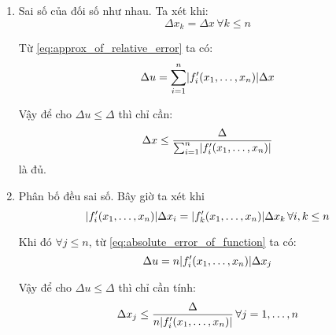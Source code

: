 \documentclass{book}    %
\DeclarePairedDelimiter\abs{\lvert}{\rvert}%
\begin{document}
\begin{enumerate}
    \item Sai số của  đối số như nhau.
        Ta xét khi:
        \begin{equation*}
            \Delta x_k = \Delta x \, \forall k \leq n
        \end{equation*}

        Từ \ref{eq:approx_of_relative_error} ta có:
        \begin{equation*}
            \Delta u = \sum_{i=1}^{n} \abs{f'_i(x_1, \ldots, x_n)} \Delta x
        \end{equation*}

        Vậy để cho \(\Delta u \leq \Delta\) thì chỉ cần:
        \begin{equation} \label{eq:same_error}
            \Delta x \leq \frac{\Delta}{\sum_{i=1}^{n} \abs{f'_i(x_1, \ldots, x_n)}}
        \end{equation}
        là đủ.

    \item Phân bố đều sai số.
        Bây giờ ta xét khi
        \begin{equation*}
            \abs{f'_i(x_1, \ldots, x_n)} \Delta x_i = \abs{f'_k(x_1, \ldots, x_n)} \Delta x_k \, \forall i, k \leq n
        \end{equation*}

        Khi đó \(\forall j \leq n\), từ \ref{eq:absolute_error_of_function} ta có:
        \begin{equation*}
            \Delta u = n \abs{f'_i(x_1, \ldots, x_n)} \Delta x_j
        \end{equation*}

        Vậy để cho \(\Delta u \leq \Delta\) thì chỉ cần tính:
        \begin{equation} \label{eq:evenly_distributed_error}
            \Delta x_j \leq \frac{\Delta}{n \abs{f'_i(x_1, \ldots, x_n)}} \, \forall j = 1, \ldots, n
        \end{equation}
\end{enumerate}
\end{document}
